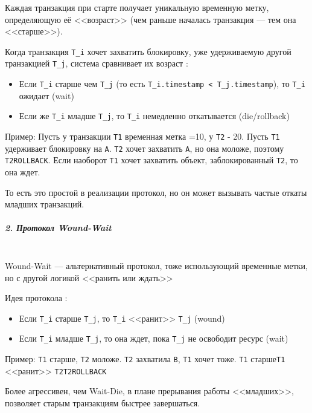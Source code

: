  Каждая транзакция при старте получает уникальную временную метку, определяющую её <<возраст>> (чем раньше началась транзакция — тем она <<старше>>).
 
 Когда транзакция \texttt{T\_i} хочет захватить блокировку, уже удерживаемую другой транзакцией \texttt{T\_j}, система сравнивает их возраст \autocite{Silberschatz, ElmasriNavathe}:
 \begin{itemize}
     \item Если \texttt{T\_i} старше чем \texttt{T\_j} (то есть \texttt{T\_i.timestamp < T\_j.timestamp}), то \texttt{T\_i} ожидает (wait)
     \item Если же \texttt{T\_i} младше \texttt{T\_j}, то \texttt{T\_i} немедленно откатывается (die/rollback)
 \end{itemize}
 
 Пример:
 Пусть у транзакции \texttt{T1} временная метка =10, у \texttt{T2} - 20. Пусть \texttt{T1} удерживает блокировку на \texttt{A}. \texttt{T2} хочет захватить \texttt{A}, но она моложе, поэтому \texttt{T2\textrightarrow ROLLBACK}. Если наоборот \texttt{T1} хочет захватить объект, заблокированный \texttt{T2}, то она ждет.
 
 То есть это простой в реализации протокол, но он может вызывать частые откаты младших транзакций.
 
 \subparagraph{2. Протокол Wound-Wait} ~\\

 Wound-Wait — альтернативный протокол, тоже использующий временные метки, но с другой логикой <<ранить или ждать>>
 
 Идея протокола \autocite{Silberschatz, ElmasriNavathe}:
 \begin{itemize}
     \item Если \texttt{T\_i} старше \texttt{T\_j}, то \texttt{T\_i} <<ранит>> \texttt{T\_j} (wound)
    \item Если \texttt{T\_i} младше \texttt{T\_j}, то она ждет, пока \texttt{T\_j} не освободит ресурс (wait)
 \end{itemize}
 
 Пример:
 \texttt{T1} старше, \texttt{T2} моложе. \texttt{T2} захватила \texttt{B}, \texttt{T1} хочет тоже. \texttt{T1} старше\textrightarrow \texttt{T1} <<ранит>> \texttt{T2}\textrightarrow \texttt{T2\textrightarrow ROLLBACK} 
 
 Более агрессивен, чем Wait-Die, в плане прерывания работы <<младших>>, позволяет старым транзакциям быстрее завершаться.
 
